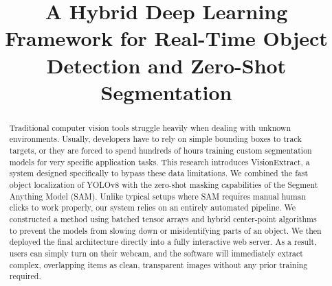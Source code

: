 \documentclass[10pt, conference]{IEEEtran}
\begin{document}
\title{A Hybrid Deep Learning Framework for Real-Time Object Detection and Zero-Shot Segmentation\\
}

\author{
\and
{}
\and
{}
\and
{}
}

\maketitle

\begin{abstract}
Traditional computer vision tools struggle heavily when dealing with unknown environments. Usually, developers have to rely on simple bounding boxes to track targets, or they are forced to spend hundreds of hours training custom segmentation models for very specific application tasks. This research introduces VisionExtract, a system designed specifically to bypass these data limitations. We combined the fast object localization of YOLOv8 with the zero-shot masking capabilities of the Segment Anything Model (SAM). Unlike typical setups where SAM requires manual human clicks to work properly, our system relies on an entirely automated pipeline. We constructed a method using batched tensor arrays and hybrid center-point algorithms to prevent the models from slowing down or misidentifying parts of an object. We then deployed the final architecture directly into a fully interactive web server. As a result, users can simply turn on their webcam, and the software will immediately extract complex, overlapping items as clean, transparent images without any prior training required.
\end{abstract}
\end{document}
